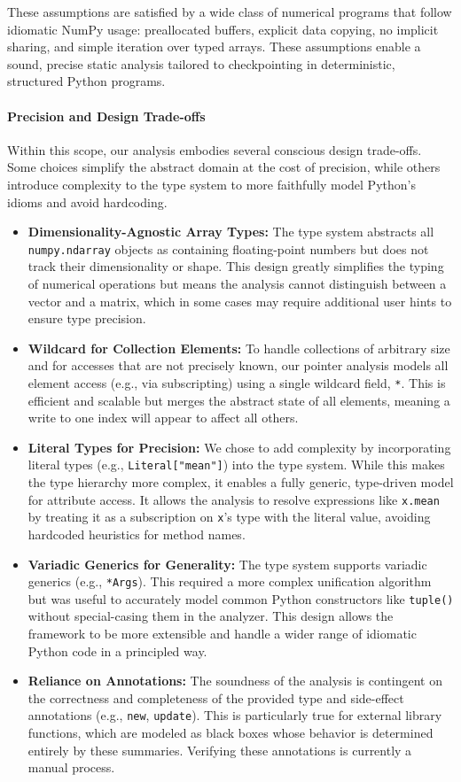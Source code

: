 These assumptions are satisfied by a wide class of numerical programs that follow idiomatic NumPy usage: preallocated buffers, explicit data copying, no implicit sharing, and simple iteration over typed arrays. These assumptions enable a sound, precise static analysis tailored to checkpointing in deterministic, structured Python programs.

\paragraph{Precision and Design Trade-offs}
Within this scope, our analysis embodies several conscious design trade-offs. Some choices simplify the abstract domain at the cost of precision, while others introduce complexity to the type system to more faithfully model Python's idioms and avoid hardcoding.
\begin{itemize}
    \item \textbf{Dimensionality-Agnostic Array Types:} The type system abstracts all \texttt{numpy.ndarray} objects as containing floating-point numbers but does not track their dimensionality or shape. This design greatly simplifies the typing of numerical operations but means the analysis cannot distinguish between a vector and a matrix, which in some cases may require additional user hints to ensure type precision.
    \item \textbf{Wildcard for Collection Elements:} To handle collections of arbitrary size and for accesses that are not precisely known, our pointer analysis models all element access (e.g., via subscripting) using a single wildcard field, \texttt{*}. This is efficient and scalable but merges the abstract state of all elements, meaning a write to one index will appear to affect all others.
    \item \textbf{Literal Types for Precision:} We chose to add complexity by incorporating literal types (e.g., \texttt{Literal["mean"]}) into the type system. While this makes the type hierarchy more complex, it enables a fully generic, type-driven model for attribute access. It allows the analysis to resolve expressions like \texttt{x.mean} by treating it as a subscription on \texttt{x}'s type with the literal value, avoiding hardcoded heuristics for method names.
    \item \textbf{Variadic Generics for Generality:} The type system supports variadic generics (e.g., \texttt{*Args}). This required a more complex unification algorithm but was useful to accurately model common Python constructors like \texttt{tuple()} without special-casing them in the analyzer. This design allows the framework to be more extensible and handle a wider range of idiomatic Python code in a principled way.
    \item \textbf{Reliance on Annotations:} The soundness of the analysis is contingent on the correctness and completeness of the provided type and side-effect annotations (e.g., \texttt{new}, \texttt{update}). This is particularly true for external library functions, which are modeled as black boxes whose behavior is determined entirely by these summaries. Verifying these annotations is currently a manual process.
\end{itemize}

